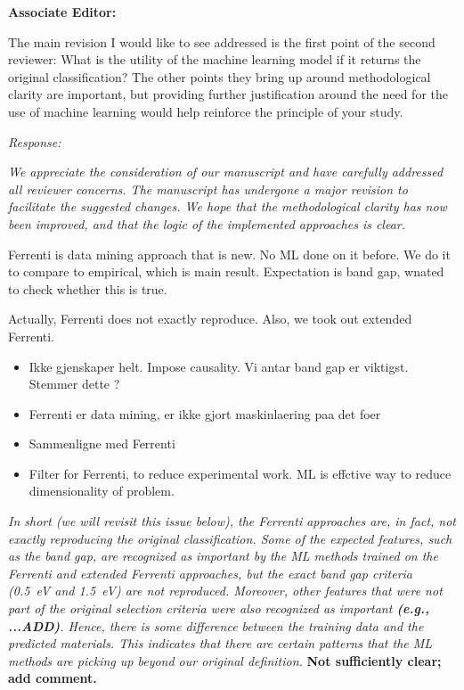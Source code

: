 \documentclass[11pt, a4paper]{letter} %
\begin{document}
\noindent
\textbf{Associate Editor:}

The main revision I would like to see addressed is the first point of the second reviewer: What is the utility of the machine learning model if it returns the original classification? The other points they bring up around methodological clarity are important, but providing further justification around the need for the use of machine learning would help reinforce the principle of your study. 


\textit{Response: }

\textit{We appreciate the consideration of our manuscript and have carefully addressed all reviewer concerns. The manuscript has undergone a major revision to facilitate the suggested changes. We hope that the methodological clarity has now been improved, and that the logic of the implemented approaches is clear. } 

Ferrenti is data mining approach that is new. No ML done on it before. We do it to compare to empirical, which is main result. Expectation is band gap, wnated to check whether this is true. 

Actually, Ferrenti does not exactly reproduce. Also, we took out extended Ferrenti. 

\begin{itemize}
    \item Ikke gjenskaper helt. Impose causality. Vi antar band gap er viktigst. Stemmer dette ?
    \item Ferrenti er data mining, er ikke gjort maskinlaering paa det foer 
    \item Sammenligne med Ferrenti 
    \item Filter for Ferrenti, to reduce experimental work. ML is effctive way to reduce dimensionality of problem. 
\end{itemize}

\textit{In short (we will revisit this issue below), the Ferrenti approaches are, in fact, not exactly reproducing the original classification.
Some of the expected features, such as the band gap, are recognized as important by the ML methods trained on the Ferrenti and extended Ferrenti approaches, but the exact band gap criteria (0.5~eV and 1.5~eV) are not reproduced.
Moreover, other features that were not part of the original selection criteria were also recognized as important \textbf{(e.g., ...ADD)}.
Hence, there is some difference between the training data and the predicted materials.
This indicates that there are certain patterns that the ML methods are picking up beyond our original definition. } 
\textbf{Not sufficiently clear; add comment. }
\end{document}
